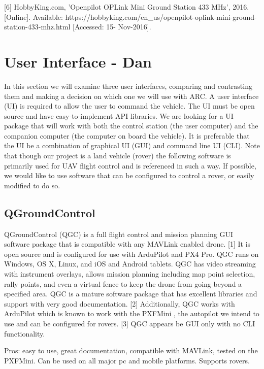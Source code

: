 \documentclass[compsoc,draftclsnofoot,onecolumn,10pt]{IEEEtran}
\begin{document}
[6] HobbyKing.com, 'Openpilot OPLink Mini Ground Station 433 MHz', 2016.  [Online]. Available: https://hobbyking.com/en\_us/openpilot-oplink-mini-ground-station-433-mhz.html [Accessed: 15- Nov-2016].\par

\newpage

\section{User Interface - Dan}
In this section we will examine three user interfaces, comparing and contrasting
them and making a decision on which one we will use with ARC.
A user interface (UI) is required to allow the user to command the vehicle. The
UI must be open source and have easy-to-implement API libraries. We are looking
for a UI package that will work with both the control station (the user
computer) and the companion computer (the computer on board the vehicle). It is
preferable that the UI be a combination of graphical UI (GUI) and command line
UI (CLI). Note that though our project is a land vehicle (rover) the following
software is primarily used for UAV flight control and is referenced in such a
way. If possible, we would like to use software that can be configured to
control a rover, or easily modified to do so.

\subsection{QGroundControl}

QGroundControl (QGC) is a full flight control and mission planning GUI software
package that is compatible with any MAVLink enabled drone. [1] It is open source and
is configured for use with ArduPilot and PX4 Pro. QGC runs on Windows, OS X,
Linux, and iOS and Android tablets. QGC has video streaming with instrument
overlays, allows mission planning including map point selection, rally points,
and even a virtual fence to keep the drone from going beyond a specified area.
QGC is a mature software package that has excellent libraries and support with
very good documentation. [2]
Additionally, QGC works with ArduPilot which is known to work with the PXFMini ,
the autopilot we intend to use and can be configured for rovers. [3] QGC appears
be GUI only with no CLI functionality.

Pros: easy to use, great documentation, compatible with MAVLink, tested on the
PXFMini. Can be used on all major pc and mobile platforms. Supports rovers.
\end{document}
